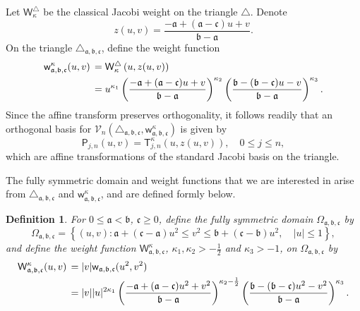 \documentclass{amsart}
\newtheorem{defn}[thm]{Definition}
\theoremstyle{remark}
\def\d{\mathrm{d}}
\def\sw{{\mathsf w}}
\def\sP{{\mathsf P}}
\def\sT{{\mathsf T}}
\def\sW{{\mathsf W}}
\def\fa{{\mathfrak a}}
\def\fb{{\mathfrak b}}
\def\fc{{\mathfrak c}}
\def\k{{\kappa}}
\def\CV{{\mathcal V}}
\def\f{\frac}
\begin{document}
Let $ \sW_\k^\triangle$ be the classical Jacobi weight on the triangle $\triangle$. Denote 
$$
     z(u,v) = \frac{-\fa+(\fa-\fc)u+v}{\fb-\fa}.
$$
On the triangle $\triangle_{\fa,\fb,\fc}$, define the weight function 
\begin{align}\label{eq:w_abc}
  \sw_{\fa,\fb,\fc}^\k (u,v)  &\, = \sW_\k^\triangle\left(u,z(u,v) \right) \\
       &\, =u^{\k_1} \left(\frac{-\fa+(\fa-\fc)u+v}{\fb-\fa}\right)^{\k_2} 
       \left(\frac{\fb-(\fb-\fc)u-v}{\fb-\fa}\right)^{\k_3}.\notag
\end{align}
Since the affine transform preserves orthogonality, it follows readily that an orthogonal basis for 
$\CV_n( \triangle_{\fa,\fb,\fc}, \sw_{\fa,\fb,\fc}^\k)$ is given by 
\begin{equation} \label{eq:OPabc}
  \sP_{j,n}(u,v) = \sT_{j,n}^\k \left(u,z(u,v) \right), \quad 0 \le j \le n,
\end{equation}
which are affine transformations of the standard Jacobi basis on the triangle. 

The fully symmetric domain and weight functions that we are interested in arise from $\triangle_{\fa,\fb,\fc}$ and 
$\sw_{\fa,\fb,\fc}^\k$, and are defined formly below. 

\begin{defn}\label{defn:Oabc}
For $0 \le \fa < \fb$, $\fc \ge 0$, define the fully symmetric domain $\Omega_{\fa,\fb,\fc}$ by 
$$
   \Omega_{\fa,\fb,\fc} = \left \{(u,v): \fa + (\fc-\fa) u^2 \le v^2 \le  \fb + (\fc-\fb) u^2, \quad  |u| \le 1\right \},
$$
and define the weight function $\sW_{\fa,\fb,\fc}^\k$, $\k_1,\k_2 > -\f12$ and $\k_3 > -1$, on $\Omega_{\fa,\fb,\fc}$ by 
\begin{align} \label{eq:sWabcB2}
  \sW_{\fa,\fb,\fc}^\k(u,v) \,& = |v| \sw_{\fa, \fb,\fc}(u^2,v^2) \\
     \, & = |v| |u|^{2 \k_1}  
      \left(\frac{-\fa+(\fa-\fc)u^2+v^2}{\fb-\fa}\right)^{\k_2-\f12} \left(\frac{\fb-(\fb-\fc)u^2-v^2}{\fb-\fa}\right)^{\k_3}. \notag
\end{align}
\end{defn}
\end{document}
